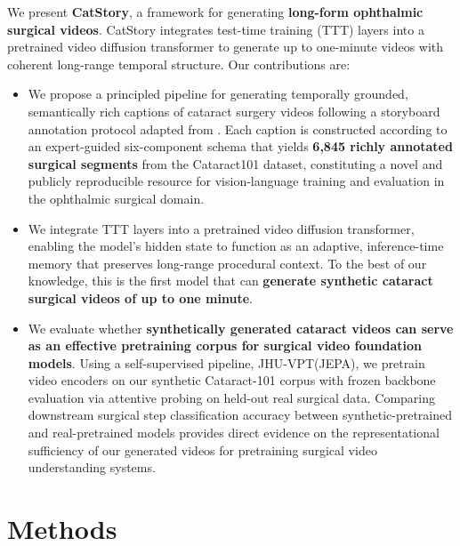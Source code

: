 \documentclass[runningheads]{llncs}
\begin{document}
We present \textbf{CatStory}, a framework for generating \textbf{long-form ophthalmic surgical videos}. CatStory integrates test-time training (TTT) layers\cite{dalal2025oneminutevideogenerationtesttime} into a pretrained video diffusion transformer to generate up to one-minute videos with coherent long-range temporal structure. Our contributions are:
\begin{itemize}
    \item We propose a principled pipeline for generating temporally grounded, semantically rich captions of cataract surgery videos following a storyboard annotation protocol adapted from \cite{dalal2025oneminutevideogenerationtesttime}. Each caption is constructed according to an expert-guided six-component schema that yields \textbf{6,845 richly annotated surgical segments} from the Cataract101 dataset, constituting a novel and publicly reproducible resource for vision-language training and evaluation in the ophthalmic surgical domain.
    \item We integrate TTT layers into a pretrained video diffusion transformer, enabling the model's hidden state to function as an adaptive, inference-time memory that preserves long-range procedural context. To the best of our knowledge, this is the first model that can \textbf{generate synthetic cataract surgical videos of up to one minute}. 
    \item We evaluate whether \textbf{synthetically generated cataract videos can serve as an effective pretraining corpus for surgical video foundation models}. Using a self-supervised pipeline, JHU-VPT(JEPA)\cite{shah2025vision}, we pretrain video encoders on our synthetic Cataract-101 corpus with frozen backbone evaluation via attentive probing on held-out real surgical data. Comparing downstream surgical step classification accuracy between synthetic-pretrained and real-pretrained models provides direct evidence on the representational sufficiency of our generated videos for pretraining surgical video understanding systems.
\end{itemize}

\section{Methods}
\end{document}
